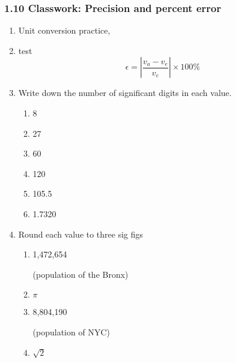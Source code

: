 

\fancyhead[LE]{\thepage}



\subsubsection*{1.10 Classwork: Precision and percent error} 
\begin{enumerate}
\item Unit conversion practice, 
\item  test   $$\epsilon = \left|\frac{v_a-v_e}{v_e}\right| \times 100\%$$


\item Write down the number of significant digits in each value.
  \begin{multicols}{3}
    \begin{enumerate}[itemsep=1cm]
      \item 8
      \item 27
      \item 60
      \item 120
      \item 105.5
      \item 1.7320
    \end{enumerate}
  \end{multicols} \vspace{1cm}

\item Round each value to three sig figs
  \begin{multicols}{2}
    \begin{enumerate}[itemsep=0.5cm]
      \item 1,472,654 \par (population of the Bronx)
      \item $\pi$
      \item 8,804,190 \par (population of NYC)
      \item $\sqrt{2}$
    \end{enumerate}
  \end{multicols} \vspace{1cm}


\end{enumerate}
